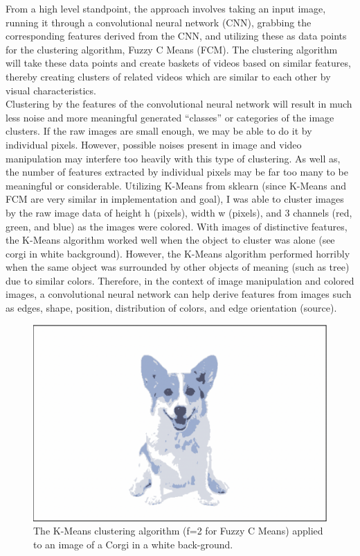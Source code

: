 \documentclass[10pt,twocolumn]{article}
\begin{document}
\indent From a high level standpoint, the approach involves taking an input image, running it through a convolutional neural network (CNN), grabbing the corresponding features derived from the CNN, and utilizing these as data points for the clustering algorithm, Fuzzy C Means (FCM). The clustering algorithm will take these data points and create baskets of videos based on similar features, thereby creating clusters of related videos which are similar to each other by visual characteristics. 
\\
\indent 
Clustering by the features of the convolutional neural network will result in much less noise and more meaningful generated “classes” or categories of the image clusters. If the raw images are small enough, we may be able to do it by individual pixels. However, possible noises present in image and video manipulation may interfere too heavily with this type of clustering. As well as, the number of features extracted by individual pixels may be far too many to be meaningful or considerable. Utilizing K-Means from sklearn (since K-Means and FCM are very similar in implementation and goal), I was able to cluster images by the raw image data of height h (pixels), width w (pixels), and 3 channels (red, green, and blue) as the images were colored. With images of distinctive features, the K-Means algorithm worked well when the object to cluster was alone (see corgi in white background). However, the K-Means algorithm performed horribly when the same object was surrounded by other objects of meaning (such as tree) due to similar colors. Therefore, in the context of image manipulation and colored images, a convolutional neural network can help derive features from images such as edges, shape, position, distribution of colors, and edge orientation (source).

\begin{figure}
  \centering
  \includegraphics[scale=0.2]{corgi-white.png}
  \vspace{20px}
  \caption{The K-Means clustering algorithm (f=2 for Fuzzy C Means) applied to an image of a Corgi in a white back-ground.}
  \label{corgi:white}
\end{figure}
\end{document}
